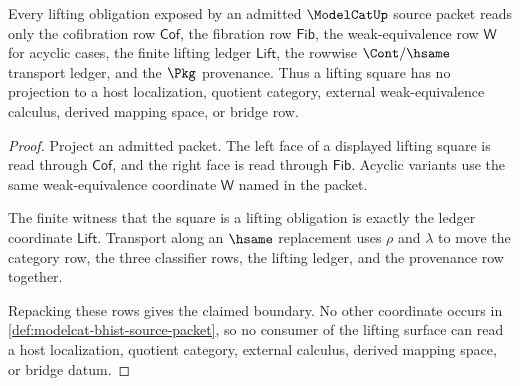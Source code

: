 \begin{theorem}
\label{thm:modelcat-lifting-square-boundary}
Every lifting obligation exposed by an admitted $\ModelCatUp$ source packet
reads only the cofibration row $\mathsf{Cof}$, the fibration row
$\mathsf{Fib}$, the weak-equivalence row $\mathsf{W}$ for acyclic cases, the
finite lifting ledger $\mathsf{Lift}$, the rowwise $\Cont/\hsame$ transport
ledger, and the $\Pkg$ provenance. Thus a lifting square has no projection to a
host localization, quotient category, external weak-equivalence calculus,
derived mapping space, or bridge row.
\end{theorem}
\begin{proof}
Project an admitted packet. The left face of a displayed lifting square is read
through $\mathsf{Cof}$, and the right face is read through $\mathsf{Fib}$.
Acyclic variants use the same weak-equivalence coordinate $\mathsf{W}$ named in
the packet.

The finite witness that the square is a lifting obligation is exactly the
ledger coordinate $\mathsf{Lift}$. Transport along an $\hsame$ replacement uses
$\rho$ and $\lambda$ to move the category row, the three classifier rows, the
lifting ledger, and the provenance row together.

Repacking these rows gives the claimed boundary. No other coordinate occurs in
\autoref{def:modelcat-bhist-source-packet}, so no consumer of the lifting
surface can read a host localization, quotient category, external calculus,
derived mapping space, or bridge datum.
\end{proof}

